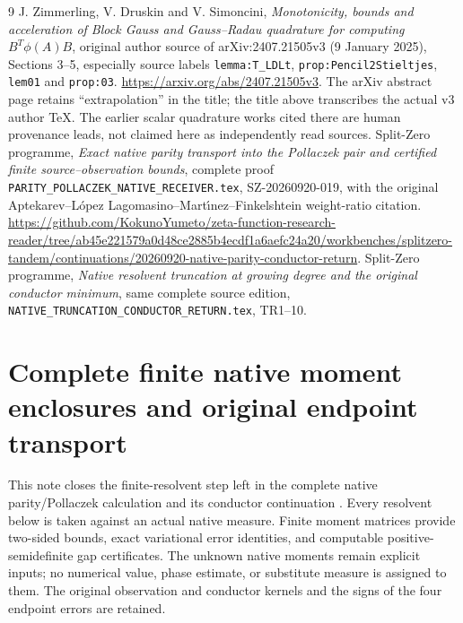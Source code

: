\documentclass[11pt]{article}
\begin{document}
\begin{thebibliography}{9}
 J. Zimmerling, V. Druskin and V. Simoncini,
\emph{Monotonicity, bounds and acceleration of Block Gauss and
Gauss--Radau quadrature for computing $B^T\phi(A)B$}, original
author source of arXiv:2407.21505v3 (9 January 2025),
Sections 3--5, especially source labels
\texttt{lemma:T\_LDLt}, \texttt{prop:Pencil2Stieltjes},
\texttt{lem01} and \texttt{prop:03}.
\url{https://arxiv.org/abs/2407.21505v3}.
The arXiv abstract page retains ``extrapolation'' in the title;
the title above transcribes the actual v3 author TeX.
The earlier scalar quadrature works cited there are human
provenance leads, not claimed here as independently read sources.
 Split-Zero programme, \emph{Exact native parity transport
into the Pollaczek pair and certified finite source--observation bounds},
complete proof \texttt{PARITY\_POLLACZEK\_NATIVE\_RECEIVER.tex},
SZ-20260920-019, with the original Aptekarev--L\'opez
Lagomasino--Mart\'{\i}nez--Finkelshtein weight-ratio citation.
\url{https://github.com/KokunoYumeto/zeta-function-research-reader/tree/ab45e221579a0d48ce2885b4ecdf1a6aefc24a20/workbenches/splitzero-tandem/continuations/20260920-native-parity-conductor-return}.
 Split-Zero programme, \emph{Native resolvent truncation at
growing degree and the original conductor minimum}, same complete
source edition, \texttt{NATIVE\_TRUNCATION\_CONDUCTOR\_RETURN.tex}, TR1--10.
\end{thebibliography}

\endgroup

\clearpage\begingroup
\part*{Complete finite native moment enclosures and original endpoint transport}
\newtheorem{mmnativetheorem}{Theorem}
\newtheorem{mmnativelemma}[mmnativetheorem]{Lemma}
\newtheorem{mmnativeproposition}[mmnativetheorem]{Proposition}
\newcommand{\mmnativeC}{\mathbb C}
\newcommand{\mmnativeR}{\mathbb R}
\newcommand{\mmnativediag}{\operatorname{diag}}
\newcommand{\mmnativeim}{\operatorname{im}}
\newcommand{\mmnativetr}{\operatorname{tr}}
\newcommand{\mmnativenorm}[1]{\left\lVert#1\right\rVert}


This note closes the finite-resolvent step left in the complete native
parity/Pollaczek calculation \cite{mmnative:PP} and its conductor continuation
\cite{mmnative:TR}.  Every resolvent below is taken against an actual native
measure.  Finite moment matrices provide two-sided bounds, exact
variational error identities, and computable positive-semidefinite gap
certificates.  The unknown native moments remain explicit inputs; no
numerical value, phase estimate, or substitute measure is assigned to
them.  The original observation and conductor kernels and the signs of
the four endpoint errors are retained.
\end{document}
